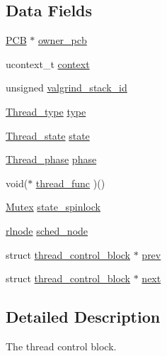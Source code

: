 \subsection*{Data Fields}
\begin{DoxyCompactItemize}
\item 
\hyperlink{group__proc_gadf327f09ee935cf1734c14e8849f0421}{P\-C\-B} $\ast$ \hyperlink{structthread__control__block_a74aa312623cb8be2bc719d5210b58c04}{owner\-\_\-pcb}
\item 
ucontext\-\_\-t \hyperlink{structthread__control__block_a1531cf79cdf266e2b53239177520896b}{context}
\item 
unsigned \hyperlink{structthread__control__block_ad8a2da36c0ad775c12c5f66f4fec9d41}{valgrind\-\_\-stack\-\_\-id}
\item 
\hyperlink{group__scheduler_ga18795bc1ab00161fc27ce34b1895fb03}{Thread\-\_\-type} \hyperlink{structthread__control__block_abd0f40bdcb22c701df03f560bbc42d5c}{type}
\item 
\hyperlink{group__scheduler_ga6c969c169777f82c104cf73e501df70f}{Thread\-\_\-state} \hyperlink{structthread__control__block_affd872365cf4768fa1c9bd1e196bb97c}{state}
\item 
\hyperlink{group__scheduler_gab180b4aa356776bddcd724cef4f5deae}{Thread\-\_\-phase} \hyperlink{structthread__control__block_aa7e8e6a00c5f9f25210a49589ad818f8}{phase}
\item 
void($\ast$ \hyperlink{structthread__control__block_af78d506b8afb849bd2ea09d23b787c00}{thread\-\_\-func} )()
\item 
\hyperlink{group__syscalls_gaef2ec62cae8e0031fd19fc8b91083ade}{Mutex} \hyperlink{structthread__control__block_a02ae35e9893c3b86f5e6dafe7b8c0065}{state\-\_\-spinlock}
\item 
\hyperlink{group__rlists_ga8f6244877f7ce2322c90525217ea6e7a}{rlnode} \hyperlink{structthread__control__block_add433b079e04053fe70fdd2b92e1d6ad}{sched\-\_\-node}
\item 
struct \hyperlink{structthread__control__block}{thread\-\_\-control\-\_\-block} $\ast$ \hyperlink{structthread__control__block_a605a6e9bb8154b658ee72e193599d180}{prev}
\item 
struct \hyperlink{structthread__control__block}{thread\-\_\-control\-\_\-block} $\ast$ \hyperlink{structthread__control__block_ac6b51ca735291f730ca1d4c335fb9359}{next}
\end{DoxyCompactItemize}


\subsection{Detailed Description}
The thread control block. 

